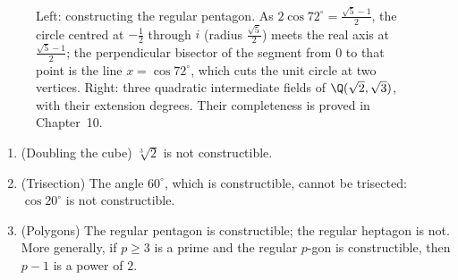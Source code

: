 \begin{figure}[ht]
\centering
{}
\caption{Left: constructing the regular pentagon. As $2\cos72^\circ=\frac{\sqrt5-1}2$, the circle centred at $-\frac12$ through $i$ (radius $\frac{\sqrt5}2$) meets the real axis at $\frac{\sqrt5-1}2$; the perpendicular bisector of the segment from $0$ to that point is the line $x=\cos72^\circ$, which cuts the unit circle at two vertices. Right: three quadratic intermediate fields of $\Q(\sqrt2,\sqrt3)$, with their extension degrees. Their completeness is proved in Chapter~10.}
\label{fig:pentagon}
\end{figure}

\begin{corollary}\label{cor:classical}
\begin{enumerate}[label=(\alph*)]
\item (Doubling the cube) $\sqrt[3]2$ is not constructible.
\item (Trisection) The angle $60^\circ$, which is constructible, cannot be trisected: $\cos20^\circ$ is not constructible.
\item (Polygons) The regular pentagon is constructible; the regular heptagon is not. More generally, if $p\ge3$ is a prime and the regular $p$-gon is constructible, then $p-1$ is a power of $2$.
\end{enumerate}
\end{corollary}
